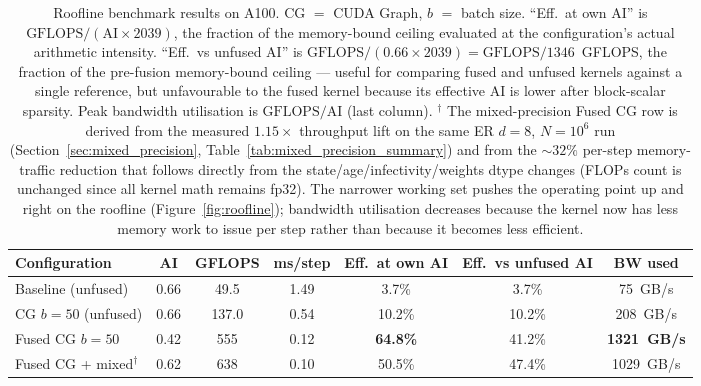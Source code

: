 \documentclass[a4paper,fleqn]{cas-sc}
\theoremstyle{definition}
\theoremstyle{remark}
\begin{document}
\begin{table}[!h]
\caption{Roofline benchmark results on A100. CG $=$ CUDA Graph, $b$ $=$ batch size. ``Eff.\ at own AI'' is $\text{GFLOPS} / (\text{AI} \times 2039)$, the fraction of the memory-bound ceiling evaluated at the configuration's actual arithmetic intensity. ``Eff.\ vs unfused AI'' is $\text{GFLOPS} / (0.66 \times 2039) = \text{GFLOPS} / 1346$~GFLOPS, the fraction of the pre-fusion memory-bound ceiling --- useful for comparing fused and unfused kernels against a single reference, but unfavourable to the fused kernel because its effective AI is lower after block-scalar sparsity. Peak bandwidth utilisation is $\text{GFLOPS}/\text{AI}$ (last column). $^\dagger$ The mixed-precision Fused CG row is derived from the measured $1.15\times$ throughput lift on the same ER $d{=}8$, $N=10^6$ run (Section~\ref{sec:mixed_precision}, Table~\ref{tab:mixed_precision_summary}) and from the $\sim\!32\%$ per-step memory-traffic reduction that follows directly from the state/age/infectivity/weights dtype changes (FLOPs count is unchanged since all kernel math remains fp32). The narrower working set pushes the operating point up and right on the roofline (Figure~\ref{fig:roofline}); bandwidth utilisation decreases because the kernel now has less memory work to issue per step rather than because it becomes less efficient.}
\label{tab:roofline}
\centering
\begin{tabular*}{\tblwidth}{@{\extracolsep{\fill}}lcccccc@{}}
\toprule
\textbf{Configuration} & \textbf{AI} & \textbf{GFLOPS} & \textbf{ms/step} & \textbf{Eff.\ at own AI} & \textbf{Eff.\ vs unfused AI} & \textbf{BW used} \\
\midrule
Baseline (unfused)  & 0.66 & 49.5  & 1.49 & 3.7\%  & 3.7\%  & 75~GB/s   \\
CG $b{=}50$ (unfused) & 0.66 & 137.0 & 0.54 & 10.2\% & 10.2\% & 208~GB/s  \\
Fused CG $b{=}50$   & 0.42 & 555   & 0.12 & \textbf{64.8\%} & 41.2\% & \textbf{1321~GB/s} \\
Fused CG + mixed$^\dagger$ & 0.62 & 638 & 0.10 & 50.5\% & 47.4\% & 1029~GB/s \\
\bottomrule
\end{tabular*}
\end{table}
\end{document}
